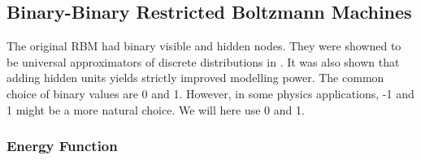 \documentclass[twoside,english]{uiofysmaster}
\newcommand*\dif{\mathop{}\!\mathrm{d}}
\begin{document}
\begin{comment}
\subsubsection{Conditional Probability Density Functions}
Using Bayes theorem:
\begin{align}
	P_{RBM} (\bm{h}|\bm{x}) =& \frac{P_{RBM} (\bm{x}, \bm{h})}{P_{RBM} (\bm{x})} \nonumber \\
	=& \frac{\frac{1}{Z_{RBM}} e^{\sum_{i, k} a_i^k \alpha_i^k (x_i)
	+ \sum_{j, l} b_j^l \beta_j^l (h_j) 
	+ \sum_{i,j,k,l} \alpha_i^k (x_i) w_{ij}^{kl} \beta_j^l (h_j)}}
	{\frac{1}{Z_{RBM}} e^{\sum_{i, k} a_i^k \alpha_i^k (x_i)}
	\prod_j^N \int e^{\sum_l b_j^l \beta_j^l (\tilde{h}_j) + \sum_{i,k,l} \alpha_i^k (x_i) w_{ij}^{kl} \beta_j^l (\tilde{h}_j)}  \dif \tilde{h}_j} \nonumber \\
	=& \prod_j^N \frac{e^{\sum_l b_j^l \beta_j^l (h_j) + \sum_{i,k,l} \alpha_i^k (x_i) w_{ij}^{kl} \beta_j^l (h_j)} }
	{\int e^{\sum_l b_j^l \beta_j^l (\tilde{h}_j) + \sum_{i,k,l} \alpha_i^k (x_i) w_{ij}^{kl} \beta_j^l (\tilde{h}_j)}  \dif \tilde{h}_j}
\end{align}
Similarly
\begin{align}
	P_{RBM} (\bm{x}|\bm{h}) =&  \frac{P_{RBM} (\bm{x}, \bm{h})}{P_{RBM} (\bm{h})} \nonumber \\
	=& \prod_i^M \frac{e^{\sum_k a_i^k \alpha_i^k (x_i)
	+ \sum_{j,k,l} \alpha_i^k (x_i) w_{ij}^{kl} \beta_j^l (h_j)}}
	{\int e^{\sum_k a_i^k \alpha_i^k (\tilde{x}_i)
	+ \sum_{j,k,l} \alpha_i^k (\tilde{x}_i) w_{ij}^{kl} \beta_j^l (h_j)} \dif \tilde{x}_i}
\end{align}
\end{comment}


\subsection{Binary-Binary Restricted Boltzmann Machines}
The original RBM had binary visible and hidden nodes. They were showned to be universal approximators of discrete distributions in \cite{LeRoux2008}. It was also shown that adding hidden units yields strictly improved modelling power. The common choice of binary values are 0 and 1. However, in some physics applications, -1 and 1 might be a more natural choice. We will here use 0 and 1.


\subsubsection{Energy Function}
\end{document}
